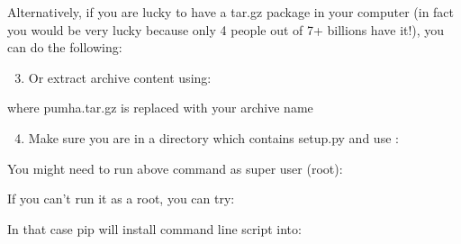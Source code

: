 \documentclass[letterpaper,10pt,english]{sphinxmanual}
\begin{document}
Alternatively, if you are lucky to have a tar.gz package in your computer (in fact you would be very lucky because only 4 people out of 7+ billions have it!), you can do the following:
\begin{enumerate}
\setcounter{enumi}{2}
\item {} 
Or extract archive content using:

\begin{sphinxVerbatim}[commandchars=\\\{\}]
  
\end{sphinxVerbatim}

\end{enumerate}

where pumha.tar.gz is replaced with your archive name
\begin{enumerate}
\setcounter{enumi}{3}
\item {} 
Make sure you are in a directory which contains setup.py and use :

\begin{sphinxVerbatim}[commandchars=\\\{\}]
  
\end{sphinxVerbatim}

\end{enumerate}

You might need to run above command as super user (root):

\begin{sphinxVerbatim}[commandchars=\\\{\}]
   
\end{sphinxVerbatim}

If you can’t run it as a root, you can try:

\begin{sphinxVerbatim}[commandchars=\\\{\}]
   
\end{sphinxVerbatim}

In that case pip will install command line script into:

\begin{sphinxVerbatim}[commandchars=\\\{\}]
\end{sphinxVerbatim}
\end{document}
